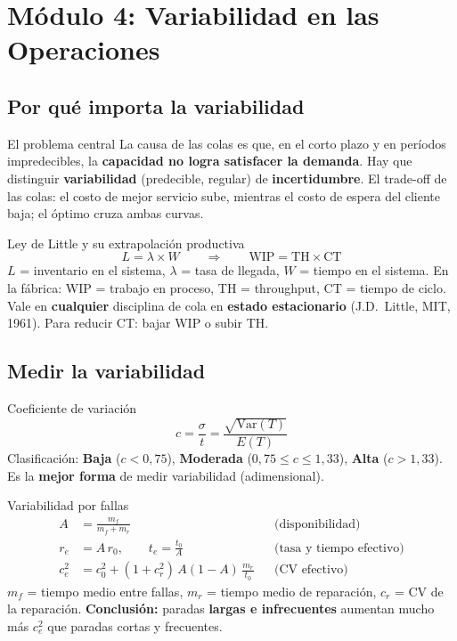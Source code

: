 \section{Módulo 4: Variabilidad en las Operaciones}

\subsection{Por qué importa la variabilidad}

\begin{definicion}{El problema central}
La causa de las colas es que, en el corto plazo y en períodos impredecibles, la \textbf{capacidad no logra satisfacer la demanda}. Hay que distinguir \textbf{variabilidad} (predecible, regular) de \textbf{incertidumbre}. El trade-off de las colas: el costo de mejor servicio sube, mientras el costo de espera del cliente baja; el óptimo cruza ambas curvas.
\end{definicion}

\begin{formulas}{Ley de Little y su extrapolación productiva}
\[
  L = \lambda \times W \qquad\Longrightarrow\qquad \text{WIP} = \text{TH} \times \text{CT}
\]
$L$ = inventario en el sistema, $\lambda$ = tasa de llegada, $W$ = tiempo en el sistema. En la fábrica: WIP = trabajo en proceso, TH = throughput, CT = tiempo de ciclo. Vale en \textbf{cualquier} disciplina de cola en \textbf{estado estacionario} (J.D.\ Little, MIT, 1961). Para reducir CT: bajar WIP o subir TH.
\end{formulas}

\subsection{Medir la variabilidad}

\begin{formulas}{Coeficiente de variación}
\[
  c = \frac{\sigma}{t} = \frac{\sqrt{\text{Var}(T)}}{E(T)}
\]
Clasificación: \textbf{Baja} ($c<0{,}75$), \textbf{Moderada} ($0{,}75 \le c \le 1{,}33$), \textbf{Alta} ($c>1{,}33$). Es la \textbf{mejor forma} de medir variabilidad (adimensional).
\end{formulas}

\begin{formulas}{Variabilidad por fallas}
\begin{align*}
  A &= \frac{m_f}{m_f + m_r} && \text{(disponibilidad)}\\
  r_e &= A\,r_0, \qquad t_e = \frac{t_0}{A} && \text{(tasa y tiempo efectivo)}\\
  c_e^2 &= c_0^2 + (1 + c_r^2)\,A(1-A)\,\frac{m_r}{t_0} && \text{(CV efectivo)}
\end{align*}
$m_f$ = tiempo medio entre fallas, $m_r$ = tiempo medio de reparación, $c_r$ = CV de la reparación. \textbf{Conclusión:} paradas \textbf{largas e infrecuentes} aumentan mucho más $c_e^2$ que paradas cortas y frecuentes.
\end{formulas}

